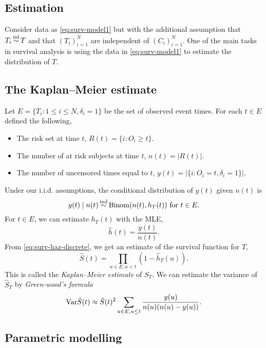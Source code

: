 \subsection{Estimation}

Consider data as \eqref{eq:surv-model1} but with the additional assumption that $T_i \simiid T$ and that $(T_i)_{i=1}^N$ are independent of  $(C_i)_{i=1}^N$. One of the main tasks in survival analysis is using the data in \eqref{eq:surv-model1} to estimate the distribution of $T$. 

\subsection*{The Kaplan--Meier estimate}

Let $E = \{T_i : 1 \le i \le N, \delta_i = 1\}$ be the set of observed event times. For each $t \in E$ defined the following,
\begin{itemize}
    \item The risk set at time $t$, $R(t) = \{i:O_i \ge t\}$.
    \item The number of at risk subjects at time $t$, $n(t) = |R(t)|$.
    \item The number of uncensored times equal to $t$, $y(t) = |\{i : O_i =t, \delta_i=1\}|$. 
\end{itemize}
Under our i.i.d. assumptions, the conditional distribution of $y(t)$ given $n(t)$ is
\[y(t) \mid n(t) \simind \mathrm{Binom}(n(t),h_T(t)) \text{ for } t \in E. \]
For $t \in E$, we can estimate $h_T(t)$ with the MLE,
\[\hat{h}(t) = \frac{y(t)}{n(t)}. \]
From \eqref{eq:surv-haz-discrete}, we get an estimate of the survival function for $T$,
\[\hat{S}(t) = \prod_{u \in E, u < t}(1-\hat{h}_T(u)). \]
This is called the \emph{Kaplan--Meier estimate} of $S_T$. We can estimate the variance of  $\hat{S}_T$ by \emph{Green-wood's formula}
\[\mathrm{Var}{\hat{S}(t)} \approx \hat{S}(t)^2 \sum_{u \in E, u \le t} \frac{y(u)}{n(u)(n(u)-y(u))}.\]

\subsection*{Parametric modelling}

